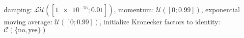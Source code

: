 damping: $\mathcal{LU}([\num[scientific-notation=true]{1e-15}; \num[scientific-notation=true]{0.01}])$, momentum: $\mathcal{U}([\num[scientific-notation=false]{0}; \num[scientific-notation=true]{0.99}])$, exponential moving average: $\mathcal{U}([\num[scientific-notation=false]{0}; \num[scientific-notation=true]{0.99}])$, initialize Kronecker factors to identity: $\mathcal{C}(\{\text{no},\text{yes}\})$